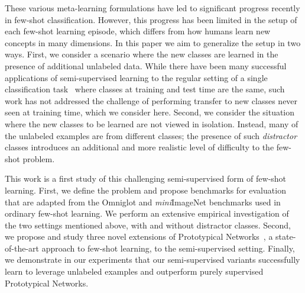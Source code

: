 These various meta-learning formulations have led to significant progress recently in few-shot
classification. However, this progress has been limited in the setup of each few-shot learning
episode, which differs from how humans learn new concepts in many dimensions. 
In this paper we aim to generalize the setup in two ways. 
First, we consider a scenario where the new classes are learned in the presence of additional 
unlabeled data. While there have been many successful applications of semi-supervised learning to the
regular setting of a single classification task~\citep{ChapelleO2010} where classes at training and 
test time are the same, such work has not addressed the challenge of performing transfer to new 
classes never seen at training time, which we consider here. 
Second, we consider the situation where the new classes to be learned are not viewed in isolation. 
Instead, many of the unlabeled examples are from different classes; the presence of such 
{\it distractor} classes introduces an additional and more realistic level of difficulty to the 
few-shot problem.

This work is a first study of this challenging semi-supervised form of few-shot learning. First, we
define the problem and propose benchmarks for evaluation that are adapted from the Omniglot and 
{\it mini}ImageNet benchmarks used in ordinary few-shot learning. We perform an extensive empirical
investigation of the two settings mentioned above, with and without distractor classes. Second, we
propose and study three novel extensions of Prototypical Networks~\citep{snell2017protonet}, a
state-of-the-art approach to few-shot learning, to the semi-supervised setting. Finally, we
demonstrate in our experiments that our semi-supervised variants successfully learn to leverage
unlabeled examples and outperform purely supervised Prototypical Networks.
